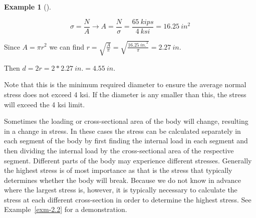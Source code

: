 \documentclass[
  letterpaper,
  DIV=11,
  numbers=noendperiod]{scrreprt}
\theoremstyle{definition}
\newtheorem{example}{Example}[chapter]
\theoremstyle{remark}
\begin{document}
\begin{tcolorbox}
\begin{example}[]
\begin{tcolorbox}
\[
\sigma=\frac{N}{A} \rightarrow A=\frac{N}{\sigma}=\frac{65{~kips}}{4{~ksi}}=16.25 {~in}^2
\]

Since \(A=\pi r^2\) we can find
\(r=\sqrt{\frac{A}{\pi}}=\sqrt{\frac{16.25{~in.}^2}{\pi}}=2.27{~in}\).

Then \(d=2 r=2 * 2.27{~in.}=4.55{~in.}\)

Note that this is the minimum required diameter to ensure the average
normal stress does not exceed 4 ksi. If the diameter is any smaller than
this, the stress will exceed the 4 ksi limit.

\end{tcolorbox}

\end{example}

\end{tcolorbox}

Sometimes the loading or cross-sectional area of the body will change,
resulting in a change in stress. In these cases the stress can be
calculated separately in each segment of the body by first finding the
internal load in each segment and then dividing the internal load by the
cross-sectional area of the respective segment. Different parts of the
body may experience different stresses. Generally the highest stress is
of most importance as that is the stress that typically determines
whether the body will break. Because we do not know in advance where the
largest stress is, however, it is typically necessary to calculate the
stress at each different cross-section in order to determine the highest
stress. See Example~\ref{exm-2.2} for a demonstration.
\end{document}
